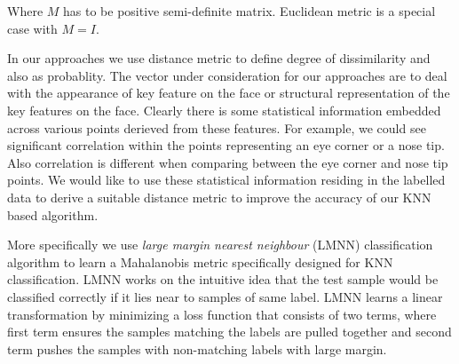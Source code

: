 Where $M$ has to be positive semi-definite matrix. Euclidean metric is a special case with $M = I$.

In our approaches we use distance metric to define degree of dissimilarity and also as probablity. 
The vector under consideration for our approaches are to deal with the appearance of key feature on
the face or structural representation of the key features on the face. Clearly there is some
statistical information embedded across various points derieved from these features. For example,
we could see significant correlation within the points representing an eye corner or a nose tip.
Also correlation is different when comparing between the eye corner and nose tip points. We
would like to use these statistical information residing in the labelled data to derive a 
suitable distance metric to improve the accuracy of our KNN based algorithm.

More specifically we use \textit{large margin nearest neighbour} (LMNN) classification algorithm
to learn a Mahalanobis metric specifically designed for KNN classification. LMNN works on the 
intuitive idea that the test sample would be classified correctly if it lies near to samples of
same label. LMNN learns a linear transformation by minimizing a loss function that consists of 
two terms, where first term ensures the samples matching the labels are pulled together and 
second term pushes the samples with non-matching labels with large margin.


% 
